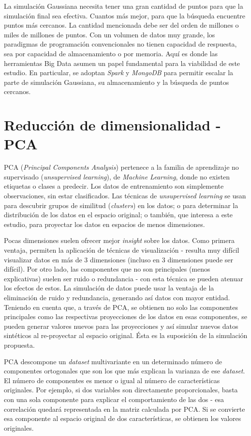 \documentclass[11pt,spanish,listoffigures,listoftables]{tfgetsinf}
\begin{document}
La simulación Gaussiana necesita tener una gran cantidad de puntos para que la simulación final sea efectiva. Cuantos más mejor, para que la búsqueda encuentre puntos más cercanos. La cantidad mencionada debe ser del orden de millones o miles de millones de puntos. Con un volumen de datos muy grande, los paradigmas de programación convencionales no tienen capacidad de respuesta, sea por capacidad de almacenamiento o por memoria. Aquí es donde las herramientas Big Data asumen un papel fundamental para la viabilidad de este estudio. En particular, se adoptan {\em Spark} y {\em MongoDB} para permitir escalar la parte de simulación Gaussiana, su almacenamiento y la búsqueda de puntos cercanos.

    \section{Reducción de dimensionalidad - PCA}
    PCA ({\em Principal Components Analysis}) pertenece a la familia de aprendizaje no supervisado ({\em unsupervised learning}), de {\em Machine Learning}, donde no existen etiquetas o clases a predecir. Los datos de entrenamiento son simplemente observaciones, sin estar clasificados. Las técnicas de {\em unsupervised learning} se usan para descubrir grupos de similitud ({\em clusters}) en los datos; o para determinar la distribución de los datos en el espacio original; o también, que interesa a este estudio, para proyectar los datos en espacios de menos dimensiones.

    Pocas dimensiones suelen ofrecer mejor {\em insight} sobre los datos. Como primera ventaja, permiten la aplicación de técnicas de visualización - resulta muy difícil visualizar datos en más de 3 dimensiones (incluso en 3 dimensiones puede ser difícil). Por otro lado, las componentes que no son principales (menos explicativas) suelen ser ruido o redundancia - con esta técnica se pueden atenuar los efectos de estos. La simulación de datos puede usar la ventaja de la eliminación de ruido y redundancia, generando así datos con mayor entidad. Teniendo en cuenta que, a través de PCA, se obtienen no solo las componentes principales como las respectivas proyecciones de los datos en esas componentes, se pueden generar valores nuevos para las proyecciones y así simular nuevos datos sintéticos al re-proyectar al espacio original. Ésta es la suposición de la simulación propuesta.
        
    PCA descompone un {\em dataset} multivariante en un determinado número de componentes ortogonales que son los que más explican la varianza de ese {\em dataset}. El número de componentes es menor o igual al número de características originales. Por ejemplo, si dos variables son directamente proporcionales, basta con una sola componente para explicar el comportamiento de las dos - esa correlación quedará representada en la matriz calculada por PCA. Si se convierte esa componente al espacio original de dos características, se obtienen los valores originales.
    
\end{document}
